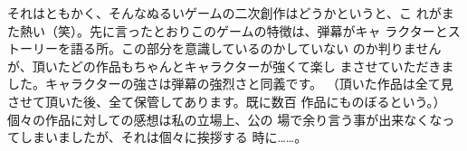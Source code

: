それはともかく、そんなぬるいゲームの二次創作はどうかというと、こ
れがまた熱い（笑）。先に言ったとおりこのゲームの特徴は、弾幕がキャ
ラクターとストーリーを語る所。この部分を意識しているのかしていない
のか判りませんが、頂いたどの作品もちゃんとキャラクターが強くて楽し
まさせていただきました。キャラクターの強さは弾幕の強烈さと同義です。
（頂いた作品は全て見させて頂いた後、全て保管してあります。既に数百
作品にものぼるという。）個々の作品に対しての感想は私の立場上、公の
場で余り言う事が出来なくなってしまいましたが、それは個々に挨拶する
時に……。